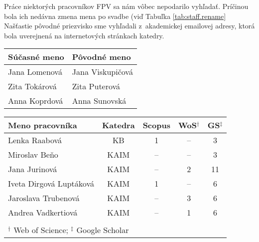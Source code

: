 Práce niektorých pracovníkov FPV sa nám vôbec nepodarilo vyhľadať. Príčinou bola
ich nedávna zmena mena po svadbe (viď Tabuľka \ref{tab:staff.rename} Našťastie
pôvodné priezvisko sme vyhľadali z~akademickej emailovej adresy, ktorá bola
uverejnená na internetových stránkach katedry.

\begin{SCtable}
  \centering\small
  \caption[Mená pracovníkov FPV, u~ktorých došlo k~zmene priezivska]%
  {Zoznam pracovníkov FPV, u~ktorých došlo k~zmene priezviska. Pôvodné
    priezvisko sme vyhľadali z~akademickej emailovej adresy.}
  \label{tab:staff.rename}
  \begin{tabular}{ll}
    \toprule
    Súčasné meno & Pôvodné meno \\
    \midrule
    Jana Lomenová & Jana Viskupičová \\
    Zita Tokárová & Zita Puterová    \\
    Anna Koprdová & Anna Sunovská    \\
    \bottomrule
  \end{tabular}
\end{SCtable}

\begin{SCtable}
  \centering\small
  \caption[Mená pracovníkov FPV, pre ktorých sa nám nepodarilo získať všetky
  dáta]%
  {Zoznam Pracovníkov FPV, pre ktorých sa nepodarilo získať z~niektorých
    citačných registrov žiadne dáta.  V~posledných troch stĺpcoch je uvedený
    počet publikácií, ktoré sa nám podarilo získať.}
  \label{tab:staff.missing}
  \begin{tabular}{lcccc}
    \toprule
    Meno pracovníka & Katedra & Scopus & WoS$^\dagger$ & GS$^\ddagger$ \\
    \midrule
    Lenka Raabová           &  KB  & 1  & --  & 3  \\
    Miroslav Beňo           & KAIM & -- & --  & 3  \\
    Jana Jurinová           & KAIM & -- & 2   & 11 \\
    Iveta Dirgová Luptáková & KAIM & 1  & --  & 6  \\
    Jaroslava Trubenová     & KAIM & -- & 3   & 6  \\
    Andrea Vadkertiová      & KAIM & -- & 1   & 6  \\
    \bottomrule \\[-2ex]
    \multicolumn{5}{l}{\footnotesize $^\dagger$ Web of Science; $^\ddagger$ Google Scholar}
  \end{tabular}
\end{SCtable}


